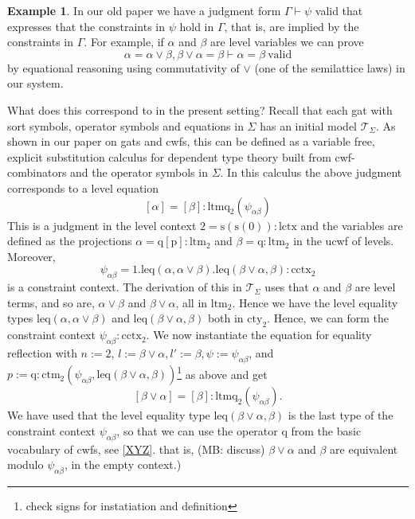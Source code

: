 \documentclass[11pt,a4paper]{article}
\theoremstyle{definition}
\newtheorem{example}{Example}
\def\psiab{\psi_{\alpha\beta}}
\newcommand{\T}{\mathsf{T}}
\def\lctx{\mathrm{lctx}}
\def\ltm{\mathrm{ltm}}
\def\ltmq{\mathrm{ltmq}}
\def\leq{\mathrm{leq}}
\def\s{\mathrm{s}}
\def\cctx{\mathrm{cctx}}
\def\cty{\mathrm{cty}}
\def\ctm{\mathrm{ctm}}
\def\p{\mathrm{p}}
\def\q{\mathrm{q}}
\def\T{\mathcal{T}}
\begin{document}
\begin{example}\label{exa:cctx-entails-lattice-eqs}
In our old paper we have a judgment form $\Gamma \vdash \psi$ valid that expresses that the constraints in $\psi$
hold in $\Gamma$, that is, are implied by the constraints in $\Gamma$.
For example, if $\alpha$ and $\beta$ are level variables we can prove
$$
\alpha = \alpha\vee\beta, \beta\vee\alpha = \beta \vdash \alpha = \beta\ \mathrm{valid}
$$
by equational reasoning using commutativity of $\vee$ (one of the semilattice laws) in our system.

What does this correspond to in the present setting? Recall that each gat with sort symbols, operator symbols and equations in $\Sigma$ has an initial model $\T_\Sigma$. As shown in our paper on gats and cwfs, this can be defined as a variable free, explicit substitution calculus for dependent type theory built from cwf-combinators and the operator symbols in $\Sigma$\cite{bezem:hofmann}. In this calculus the above judgment corresponds to a level equation
$$
[\alpha] = [\beta] : \ltmq_2(\psiab)
$$
This is a judgment in the level context $2 = \s(\s(0)) : \lctx$ and the variables are defined as the projections $\alpha = \q[\p] : \ltm_2$ and $\beta = \q  : \ltm_2$ in the ucwf of levels. Moreover, 
$$
\psiab = 1.\leq(\alpha,\alpha\vee\beta).\leq(\beta\vee\alpha,\beta) : \cctx_2
$$
is a constraint context. The derivation of this in $\T_\Sigma$ uses that 
$\alpha$ and $\beta$ are level terms, and so are, 
$\alpha\vee\beta$ and $\beta\vee\alpha$, all in $\ltm_2$.
Hence we have the level equality types
$\leq(\alpha,\alpha\vee\beta)$ and $\leq(\beta\vee\alpha,\beta)$ both in $\cty_2$. Hence, we can form the constraint context $\psiab : \cctx_2$.
We now instantiate the equation for equality reflection
with $n := 2$, $l :=  \beta\vee\alpha, l':= \beta, \psi:= \psiab$, and $p := \q: \ctm_2(\psiab,\leq(\beta\vee\alpha,\beta))$\footnote{check signs for instatiation and definition}
as above and get 
\[
[\beta\vee\alpha] = [\beta] : \ltmq_2(\psiab).
\]
We have used that the
level equality type $\leq(\beta\vee\alpha,\beta)$ is the last type
of the constraint context $\psiab$, so that we can use the operator $\q$ 
from the basic vocabulary of cwfs, see \ref{XYZ}.
that is, (MB: discuss) $\beta\vee\alpha$ and $\beta$ are equivalent
modulo $\psiab$, in the empty context.)


\end{example}
\end{document}

